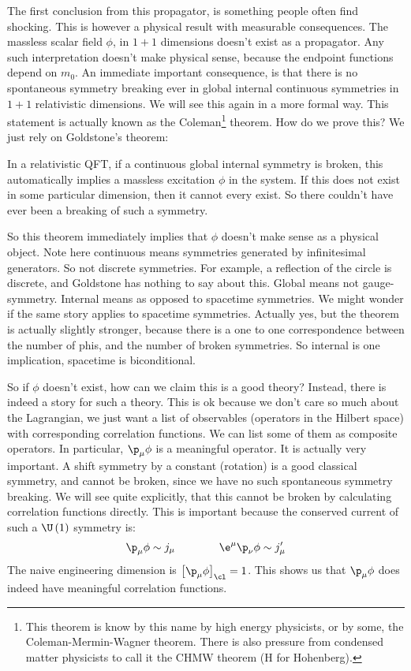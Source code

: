 \documentclass{booc}
\begin{document}
The first conclusion from this propagator, is something people often find shocking. 
This is however a physical result with measurable consequences. 
The massless scalar field $\phi$, 
in $1+1$ dimensions doesn't exist as a propagator. 
Any such interpretation doesn't make physical sense, because
the endpoint functions depend on $m_0$. 
An immediate important consequence, is that there is no
spontaneous symmetry breaking ever in global internal continuous symmetries
in $1+1$ relativistic dimensions.
We will see this again in a more formal way.
This statement is actually known as the Coleman\footnote{
This theorem is know by this name by high energy physicists, 
or by some, the Coleman-Mermin-Wagner theorem.
There is also pressure from condensed matter physicists to call it
the CHMW theorem (H for Hohenberg).}
theorem.
How do we prove this?
We just rely on Goldstone's theorem:

\begin{thm}
In a relativistic QFT, 
if a continuous global internal symmetry
is broken, this automatically implies a massless excitation $\phi$
in the system. 
If this does not exist in some particular dimension, 
then it cannot every exist. 
So there couldn't have ever been a breaking of such a symmetry.
\end{thm}

So this theorem immediately implies that $\phi$ doesn't make sense as a physical object.
Note here continuous means symmetries generated by infinitesimal generators. 
So not discrete symmetries.
For example, a reflection of the circle is discrete, and Goldstone has nothing to say about this. 
Global means not gauge-symmetry. 
Internal means as opposed to spacetime symmetries. 
We might wonder if the same story applies to spacetime symmetries.
Actually yes, but the theorem is actually slightly stronger, 
because there is a one to one correspondence between the number of phis, 
and the number of broken symmetries. 
So internal is one implication, spacetime is biconditional.

So if $\phi$ doesn't exist, how can we claim this is a good theory?
Instead, there is indeed a story for such a theory. 
This is ok because we don't care so
much about the Lagrangian, 
we just want a list of observables (operators in the Hilbert space)
with corresponding correlation functions.
We can list some of them as composite operators.
In particular, $\p_\mu \phi$
is a meaningful operator.
It is actually very important. 
A shift symmetry by a  constant (rotation) is a good classical symmetry, 
and cannot be broken, since we have no such spontaneous symmetry breaking. 
We will see quite explicitly, that this cannot be broken by calculating 
correlation functions directly.
This is important because the conserved current of such a $\U\left( 1 \right)$
symmetry is:
\begin{eqnarray}
\p_\mu \phi \sim
j_\mu 
\qquad\qquad
\e^\mu \p_\nu \phi \sim j'_\mu
\end{eqnarray}
The naive engineering dimension is $\left[ \p_\mu \phi \right]_\cl = 1$. 
This shows us that $\p_\mu \phi$ does indeed have meaningful correlation functions. 
\end{document}
